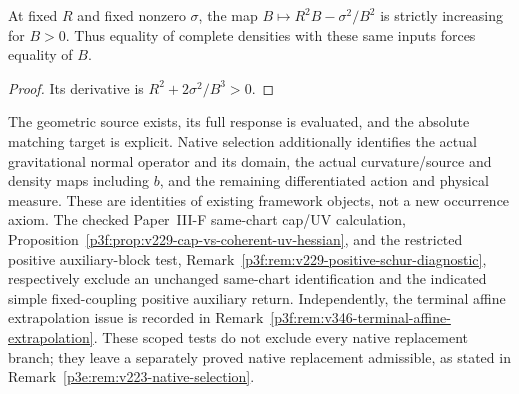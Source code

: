 \documentclass[12pt,a4paper]{article}
\begin{document}
\begin{proposition}
\label{p3e:prop:v229-complete-cap-injective}
At fixed $R$ and fixed nonzero $\sigma$, the map
$B\mapsto R^2B-\sigma^2/B^2$ is strictly increasing for $B>0$.
Thus equality of complete densities with these same inputs forces
equality of $B$.
\end{proposition}
\begin{proof}
Its derivative is $R^2+2\sigma^2/B^3>0$.
\end{proof}

\begin{remark}
\label{p3e:rem:v229-native-selection}
The geometric source exists, its full response is evaluated, and the
absolute matching target is explicit. Native selection additionally
identifies the actual gravitational normal operator and its domain,
the actual curvature/source and density maps including $b$, and the
remaining differentiated action and physical measure. These are
identities of existing framework objects, not a new occurrence axiom.
The checked Paper~III-F same-chart cap/UV calculation,
Proposition~\ref{p3f:prop:v229-cap-vs-coherent-uv-hessian}, and the
restricted positive auxiliary-block test,
Remark~\ref{p3f:rem:v229-positive-schur-diagnostic}, respectively exclude
an unchanged same-chart identification and the indicated simple
fixed-coupling positive auxiliary return.  Independently, the terminal
affine extrapolation issue is recorded in
Remark~\ref{p3f:rem:v346-terminal-affine-extrapolation}.
These scoped tests do not exclude every native replacement branch; they
leave a separately proved native replacement admissible, as stated in
Remark~\ref{p3e:rem:v223-native-selection}.
\end{remark}
\end{document}
